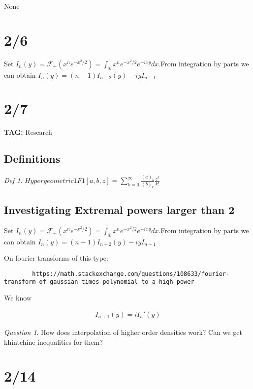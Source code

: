 \documentclass[11pt]{article}
\newcommand{\R}{\mathbb{R}}
\theoremstyle{remark}
\newtheorem*{defi}{Def}
\newtheorem*{quest}{Question}
\begin{document}
None

\section{2/6}

Set $I_n(y)  = \mathcal{F}_+(x^n e^{-x^2/2}) = \int_{\R} x^ne^{-x^2/2}e^{-ixy}dx$.From integration by parts we can obtain $I_n(y) = (n-1)I_{n-2}(y) - iyI_{n-1}$

\section{2/7}

\textbf{TAG:} Research

\subsection{Definitions}

\begin{defi}
	$Hypergeometric1F1[a,b,z]=\sum_{k=0}^{\infty} \frac{(a)_k}{(b)_k}\frac{z^k}{k!}$
\end{defi}

\subsection{Investigating Extremal powers larger than 2}

Set $I_n(y)  = \mathcal{F}_+(x^n e^{-x^2/2}) = \int_{\R} x^ne^{-x^2/2}e^{-ixy}dx$.From integration by parts we can obtain $I_n(y) = (n-1)I_{n-2}(y) - iyI_{n-1}$

\begin{remark}
	On fourier transforms of this type:
	\begin{verbatim}
		https://math.stackexchange.com/questions/108633/fourier-transform-of-gaussian-times-polynomial-to-a-high-power
	\end{verbatim}
\end{remark}

We know

\begin{align*}
	I_{n+1}(y) = i I_n'(y)
\end{align*}

\begin{quest}
	How does interpolation of higher order densities work? Can we get khintchine inequalities for them?
\end{quest}

\section{2/14}
\end{document}

